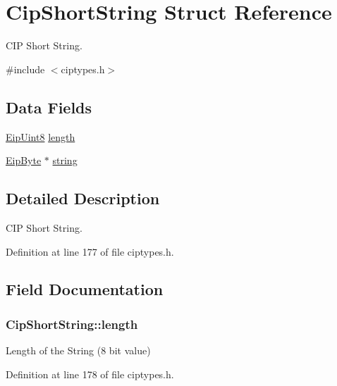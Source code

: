 \hypertarget{structCipShortString}{\section{\-Cip\-Short\-String \-Struct \-Reference}
\label{d4/def/structCipShortString}
}


\-C\-I\-P \-Short \-String.  




{\ttfamily \#include $<$ciptypes.\-h$>$}

\subsection*{\-Data \-Fields}
\begin{DoxyCompactItemize}
\item 
\hyperlink{typedefs_8h_aa0c108ee762a27720919a4634643040e}{\-Eip\-Uint8} \hyperlink{structCipShortString_a3fa14eb465ae095ab263c8df257ec500}{length}
\item 
\hyperlink{typedefs_8h_a168bac8db7e7e6d944700e1ac4717ae3}{\-Eip\-Byte} $\ast$ \hyperlink{structCipShortString_a4a9780b559b58e74f6203f6d82cfd88d}{string}
\end{DoxyCompactItemize}


\subsection{\-Detailed \-Description}
\-C\-I\-P \-Short \-String. 



\-Definition at line 177 of file ciptypes.\-h.



\subsection{\-Field \-Documentation}
\hypertarget{structCipShortString_a3fa14eb465ae095ab263c8df257ec500}{
\subsubsection[{length}]{ {\bf \-Cip\-Short\-String\-::length}}}\label{d4/def/structCipShortString_a3fa14eb465ae095ab263c8df257ec500}
\-Length of the \-String (8 bit value) 

\-Definition at line 178 of file ciptypes.\-h.



